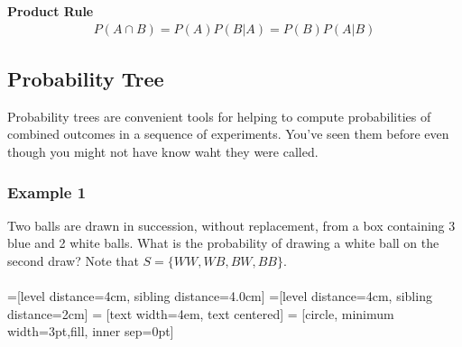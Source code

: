 \documentclass[14pt]{extarticle}
\begin{document}
\begin{tcolorbox}[enhanced jigsaw,colback=bg,boxrule=0pt,arc=0pt] 
	\textbf{Product Rule}
	\begin{align*}
		P(A\cap B) = P(A)P(B|A) = P(B)P(A|B)
	\end{align*}
\end{tcolorbox}

\subsection{Probability Tree}
Probability trees are convenient tools for helping to compute probabilities of combined outcomes in a sequence of experiments. You've seen them before even though you might not have know waht they were called.

\subsubsection{Example 1}
Two balls are drawn in succession, without replacement, from a box containing 3 blue and 2 white balls. What is the probability of drawing a white ball on the second draw? Note that $S=\{WW, WB, BW, BB\}$.
\\\\

=[level distance=4cm, sibling distance=4.0cm]
=[level distance=4cm, sibling distance=2cm]
 = [text width=4em, text centered]
 = [circle, minimum width=3pt,fill, inner sep=0pt]
\end{document}
